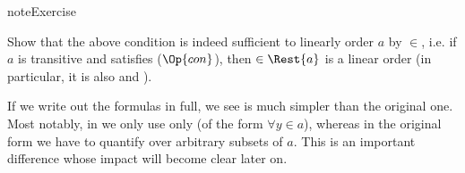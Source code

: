\documentclass[letterpaper,10pt,english]{jupyterBook}
\begin{document}
\begin{sphinxadmonition}{note}{Exercise}

\sphinxAtStartPar
Show that the above condition is indeed sufficient to linearly order \(a\) by \(\in\), i.e. if \(a\) is transitive and satisfies (\(\Op{con}\)), then \(\in\Rest{a}\) is a linear order (in particular, it is also  and ).
\end{sphinxadmonition}

\sphinxAtStartPar
If we write out the formulas in full, we see {\hyperref[\detokenize{ZFC:def-ordinal}]{}} is much simpler than the original one. Most notably, in {\hyperref[\detokenize{ZFC:def-ordinal}]{}} we only use only  (of the form \(\forall y \in a\)), whereas in the original form we have to quantify over arbitrary subsets of \(a\). This is an important difference whose impact will become clear later on.
\end{document}
